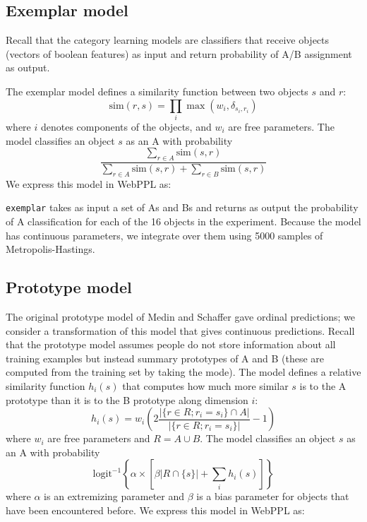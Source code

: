 \documentclass{article}
\begin{document}
\subsection{Exemplar model}

Recall that the category learning models are classifiers that receive objects (vectors of boolean features) as input and return probability of A/B assignment as output.

The exemplar model defines a similarity function between two objects $s$ and $r$:
$$ \text{sim}(r, s) = \prod_i{\max(w_i, \delta_{s_i,r_i})  }$$
where $i$ denotes components of the objects, and $w_i$ are free parameters.
The model classifies an object $s$ as an A with probability
$$ \frac{ \sum\limits_{r \in A}{\text{sim}(s,r)}}{
\sum\limits_{r \in A}{\text{sim}(s,r)} +
\sum\limits_{r \in B}{\text{sim}(s,r)}
 }$$
We express this model in WebPPL as:


\lstinline{exemplar} takes as input a set of As and Bs and returns as output the probability of A classification for each of the 16 objects in the experiment.
Because the model has continuous parameters, we integrate over them using 5000 samples of Metropolis-Hastings.

\subsection{Prototype model}

The original prototype model of Medin and Schaffer gave ordinal predictions; we consider a transformation of this model that gives continuous predictions.
Recall that the prototype model assumes people do not store information about all training examples but instead summary prototypes of A and B (these are computed from the training set by taking the mode).
The model defines a relative similarity function $h_i(s)$ that computes how much more similar $s$ is to the A prototype than it is to the B prototype along dimension $i$:
$$ h_i(s) =  w_i\left(2\frac{|\{r \in R ; r_i = s_i \} \cap A |}{|\{r \in R ; r_i = s_i \}|} - 1\right)$$
where $w_i$ are free parameters and $R = A \cup B$.
The model classifies an object $s$ as an A with probability
$$ \mathrm{logit}^{-1}\left\{ \alpha \times \left[ \beta |R \cap \{s\}| + \sum\limits_{i}{h_i(s)} \right] \right\}$$
where $\alpha$ is an extremizing parameter and $\beta$ is a bias parameter for objects that have been encountered before. We express this model in WebPPL as:

\end{document}
